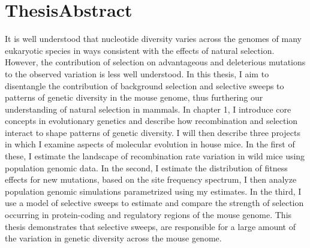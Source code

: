 
\chapter*{ThesisAbstract}

It is well understood that nucleotide diversity varies across the genomes of many eukaryotic species in ways consistent with the effects of natural selection. However, the contribution of selection on advantageous and deleterious mutations to the observed variation is less well understood. In this thesis, I aim to disentangle the contribution of background selection and selective sweeps to patterns of genetic diversity in the mouse genome, thus furthering our understanding of natural selection in mammals. In chapter 1, I introduce core concepts in evolutionary genetics and describe how recombination and selection interact to shape patterns of genetic diversity. I will then describe three projects in which I examine aspects of molecular evolution in house mice. In the first of these, I estimate the landscape of recombination rate variation in wild mice using population genomic data. In the second, I estimate the distribution of fitness effects for new mutations, based on the site frequency spectrum, I then analyze population genomic simulations parametrized using my estimates. In the third, I use a model of selective sweeps to estimate and compare the strength of selection occurring in protein-coding and regulatory regions of the mouse genome. This thesis demonstrates that selective sweeps, are responsible for a large amount of the variation in genetic diversity across the mouse genome.
